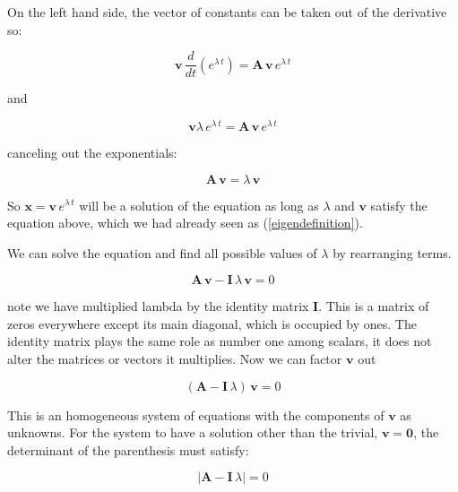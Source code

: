 \documentclass[12pt]{article}
\begin{document}
On the left hand side, the vector of  constants can be taken out of the derivative so:

\begin{equation}
	\mathbf{v} \, \frac{d}{dt} \left(  e^{\lambda \, t} \right)  = \mathbf{A} \, \mathbf{v} \, e^{\lambda \, t}  \nonumber
\end{equation}
 
 and
 
 \begin{equation}
 	\mathbf{v}   \lambda \, e^{\lambda \, t}   = \mathbf{A} \, \mathbf{v} \, e^{\lambda \, t} \nonumber
 \end{equation}
 
canceling out the exponentials:

\begin{equation}
\mathbf{A} \, \mathbf{v}  = \lambda  \,	\mathbf{v}   
\end{equation}
 
So $\mathbf{x}=\mathbf{v} \, e^{\lambda \, t}$ will be a solution of the equation as long as $\lambda$ and $\mathbf{v}$ satisfy the equation above, which we had already seen as (\ref{eigendefinition}).

We can solve the equation and find all possible values of $\lambda$ by rearranging terms.

\begin{equation}
	\mathbf{A} \, \mathbf{v}  - \mathbf{I} \, \lambda  \,	\mathbf{v}   = 0 \nonumber
\end{equation}

note we have multiplied lambda by the identity matrix $\mathbf{I}$. This is a matrix of zeros everywhere except its main diagonal, which is occupied by ones. The identity matrix plays the same role as number one among scalars, it does not alter the matrices or vectors it multiplies. Now we can factor $\mathbf{v}$ out 

\begin{equation}
	\label{solve4eigenvec}
	\left( \mathbf{A}   - \mathbf{I} \, \lambda     \right) \, \mathbf{v} =  0  
\end{equation}

This is an homogeneous system of equations with the components of $\mathbf{v}$ as unknowns. For the system to have a solution other than the trivial, $\mathbf{v}=\mathbf{0}$, the determinant of the parenthesis must satisfy:

\begin{equation}
	\label{solve4eigenval}
	\left| \mathbf{A}   - \mathbf{I} \, \lambda     \right|  =  0  
\end{equation}
\end{document}
